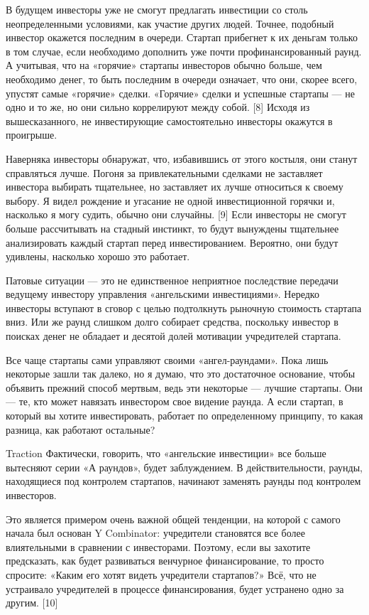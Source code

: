\documentclass[ebook,12pt,oneside,openany]{memoir}
\begin{document}
В будущем инвесторы уже не смогут предлагать инвестиции со столь
неопределенными условиями, как участие других людей. Точнее, подобный
инвестор окажется последним в очереди. Стартап прибегнет к их деньгам
только в том случае, если необходимо дополнить уже почти
профинансированный раунд. А учитывая, что на «горячие» стартапы
инвесторов обычно больше, чем необходимо денег, то быть последним в
очереди означает, что они, скорее всего, упустят самые «горячие»
сделки. «Горячие» сделки и успешные стартапы — не одно и то же, но они
сильно коррелируют между собой. [8] Исходя из вышесказанного, не
инвестирующие самостоятельно инвесторы окажутся в проигрыше.

Наверняка инвесторы обнаружат, что, избавившись от этого костыля, они
станут справляться лучше. Погоня за привлекательными сделками не
заставляет инвестора выбирать тщательнее, но заставляет их лучше
относиться к своему выбору. Я видел рождение и угасание не одной
инвестиционной горячки и, насколько я могу судить, обычно они
случайны. [9] Если инвесторы не смогут больше рассчитывать на стадный
инстинкт, то будут вынуждены тщательнее анализировать каждый стартап
перед инвестированием. Вероятно, они будут удивлены, насколько хорошо
это работает.

Патовые ситуации — это не единственное неприятное последствие передачи
ведущему инвестору управления «ангельскими инвестициями». Нередко
инвесторы вступают в сговор с целью подтолкнуть рыночную стоимость
стартапа вниз. Или же раунд слишком долго собирает средства, поскольку
инвестор в поисках денег не обладает и десятой долей мотивации
учредителей стартапа.

Все чаще стартапы сами управляют своими «ангел-раундами». Пока лишь
некоторые зашли так далеко, но я думаю, что это достаточное основание,
чтобы объявить прежний способ мертвым, ведь эти некоторые — лучшие
стартапы. Они — те, кто может навязать инвестором свое видение раунда.
А если стартап, в который вы хотите инвестировать, работает по
определенному принципу, то какая разница, как работают остальные?

Traction Фактически, говорить, что «ангельские инвестиции» все больше
вытесняют серии «А раундов», будет заблуждением. В действительности,
раунды, находящиеся под контролем стартапов, начинают заменять раунды
под контролем инвесторов.

Это является примером очень важной общей тенденции, на которой с
самого начала был основан Y Combinator: учредители становятся все
более влиятельными в сравнении с инвесторами. Поэтому, если вы
захотите предсказать, как будет развиваться венчурное финансирование,
то просто спросите: «Каким его хотят видеть учредители стартапов?»
Всё, что не устраивало учредителей в процессе финансирования, будет
устранено одно за другим. [10]
\end{document}
